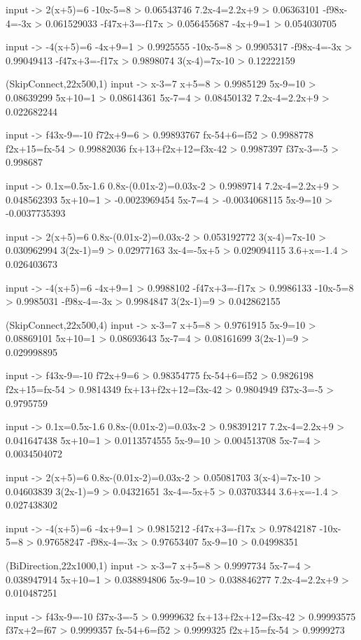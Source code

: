 input -> 2(x+5)=6
-10x-5=8 > 0.06543746
7.2x-4=2.2x+9 > 0.06363101
-f{9}{8}x-4=-3x > 0.061529033
-f{4}{7}x+3=-f{1}{7}x > 0.056455687
-4x+9=1 > 0.054030705

input -> -4(x+5)=6
-4x+9=1 > 0.9925555
-10x-5=8 > 0.9905317
-f{9}{8}x-4=-3x > 0.99049413
-f{4}{7}x+3=-f{1}{7}x > 0.9898074
3(x-4)=7x-10 > 0.12222159

(SkipConnect,22x500,1)
input -> x-3=7
x+5=8 > 0.9985129
5x-9=10 > 0.08639299
5x+10=1 > 0.08614361
5x-7=4 > 0.08450132
7.2x-4=2.2x+9 > 0.022682244

input -> f{4}{3}x-9=-10
f{7}{2}x+9=6 > 0.99893767
f{x-5}{4}+6=f{5}{2} > 0.9988778
f{2x+1}{5}=f{x-5}{4} > 0.99882036
f{x+1}{3}+f{2x+1}{2}=f{3x-4}{2} > 0.9987397
f{3}{7}x-3=-5 > 0.998687

input -> 0.1x=0.5x-1.6
0.8x-(0.01x-2)=0.03x-2 > 0.9989714
7.2x-4=2.2x+9 > 0.048562393
5x+10=1 > -0.0023969454
5x-7=4 > -0.0034068115
5x-9=10 > -0.0037735393

input -> 2(x+5)=6
0.8x-(0.01x-2)=0.03x-2 > 0.053192772
3(x-4)=7x-10 > 0.030962994
3(2x-1)=9 > 0.02977163
3x-4=-5x+5 > 0.029094115
3.6+x=-1.4 > 0.026403673

input -> -4(x+5)=6
-4x+9=1 > 0.9988102
-f{4}{7}x+3=-f{1}{7}x > 0.9986133
-10x-5=8 > 0.9985031
-f{9}{8}x-4=-3x > 0.9984847
3(2x-1)=9 > 0.042862155

(SkipConnect,22x500,4)
input -> x-3=7
x+5=8 > 0.9761915
5x-9=10 > 0.08869101
5x+10=1 > 0.08693643
5x-7=4 > 0.08161699
3(2x-1)=9 > 0.029998895

input -> f{4}{3}x-9=-10
f{7}{2}x+9=6 > 0.98354775
f{x-5}{4}+6=f{5}{2} > 0.9826198
f{2x+1}{5}=f{x-5}{4} > 0.9814349
f{x+1}{3}+f{2x+1}{2}=f{3x-4}{2} > 0.9804949
f{3}{7}x-3=-5 > 0.9795759

input -> 0.1x=0.5x-1.6
0.8x-(0.01x-2)=0.03x-2 > 0.98391217
7.2x-4=2.2x+9 > 0.041647438
5x+10=1 > 0.0113574555
5x-9=10 > 0.004513708
5x-7=4 > 0.0034504072

input -> 2(x+5)=6
0.8x-(0.01x-2)=0.03x-2 > 0.05081703
3(x-4)=7x-10 > 0.04603839
3(2x-1)=9 > 0.04321651
3x-4=-5x+5 > 0.03703344
3.6+x=-1.4 > 0.027438302

input -> -4(x+5)=6
-4x+9=1 > 0.9815212
-f{4}{7}x+3=-f{1}{7}x > 0.97842187
-10x-5=8 > 0.97658247
-f{9}{8}x-4=-3x > 0.97653407
5x-9=10 > 0.04998351

(BiDirection,22x1000,1)
input -> x-3=7
x+5=8 > 0.9997734
5x-7=4 > 0.038947914
5x+10=1 > 0.038894806
5x-9=10 > 0.038846277
7.2x-4=2.2x+9 > 0.010487251

input -> f{4}{3}x-9=-10
f{3}{7}x-3=-5 > 0.9999632
f{x+1}{3}+f{2x+1}{2}=f{3x-4}{2} > 0.99993575
f{3}{7}x+2=f{6}{7} > 0.9999357
f{x-5}{4}+6=f{5}{2} > 0.9999325
f{2x+1}{5}=f{x-5}{4} > 0.9999273


